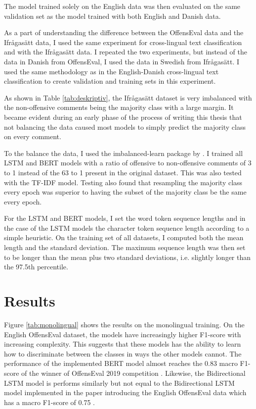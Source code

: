 \documentclass[nofilelist]{cslthse-msc}
\begin{document}
The model trained solely on the English data was then evaluated on the same validation set as the model trained with both English and Danish data.

As a part of understanding the difference between the OffensEval data and the Ifrågasätt data, I used the same experiment for cross-lingual text classification and with the Ifrågasätt data. I repeated the two experiments, but instead of the data in Danish from OffensEval, I used the data in Swedish from Ifrågasätt. I used the same methodology as in the English-Danish cross-lingual text classification to create validation and training sets in this experiment.

As shown in Table \ref{tab:deskriptiv}, the Ifrågasätt dataset is very imbalanced with the non-offensive comments being the majority class with a large margin. It became evident during an early phase of the process of writing this thesis that not balancing the data caused most models to simply predict the majority class on every comment. 

To the balance the data, I used the imbalanced-learn package by \citet{JMLR:v18:16-365}. I trained all LSTM and BERT models with a ratio of offensive to non-offensive comments of 3 to 1 instead of the 63 to 1 present in the original dataset. This was also tested with the TF-IDF model. Testing also found that resampling the majority class every epoch was superior to having the subset of the majority class be the same every epoch.

For the LSTM and BERT models, I set the word token sequence lengths and in the case of the LSTM models the character token sequence length according to a simple heuristic. On the training set of all datasets, I computed both the mean length and the standard deviation. The maximum sequence length was then set to be longer than the mean plus two standard deviations, i.e. slightly longer than the 97.5th percentile.

\chapter{Results}

Figure \ref{tab:monolingual} shows the results on the monolingual training. On the English OffensEval dataset, the models have increasingly higher F1-score with increasing complexity. This suggests that these models has the ability to learn how to discriminate between the classes in ways the other models cannot. The performance of the implemented BERT model almost reaches the 0.83 macro F1-score of the winner of OffensEval 2019 competition \citep{zampieri2019semeval}. Likewise, the Bidirectional LSTM model is performs similarly but not equal to the Bidirectional LSTM model implemented in the paper introducing the English OffensEval data which has a macro F1-score of 0.75 \citep{zampierietal2019}.
\end{document}
